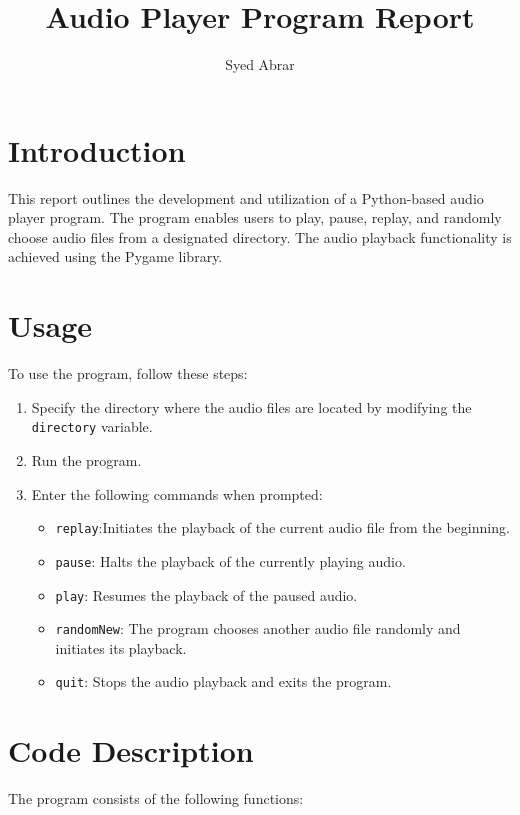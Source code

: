 \documentclass{article}
\begin{document}
\title{Audio Player Program Report}
\author{ Syed Abrar}


\maketitle

\section{Introduction}
This report outlines the development and utilization of a Python-based audio player program. The program enables users to play, pause, replay, and randomly choose audio files from a designated directory. The audio playback functionality is achieved using the Pygame library.


\section{Usage}
To use the program, follow these steps:

\begin{enumerate}
  \item Specify the directory where the audio files are located by modifying the \texttt{directory} variable.
  \item Run the program.
  \item Enter the following commands when prompted:
  \begin{itemize}
    \item \texttt{replay}:Initiates the playback of the current audio file from the beginning. 
    \item \texttt{pause}: Halts the playback of the currently playing audio.
    \item \texttt{play}: Resumes the playback of the paused audio.
    \item \texttt{randomNew}: The program chooses another audio file randomly and initiates its playback.
    \item \texttt{quit}: Stops the audio playback and exits the program.
  \end{itemize}
\end{enumerate}

\section{Code Description}
The program consists of the following functions:
\end{document}
